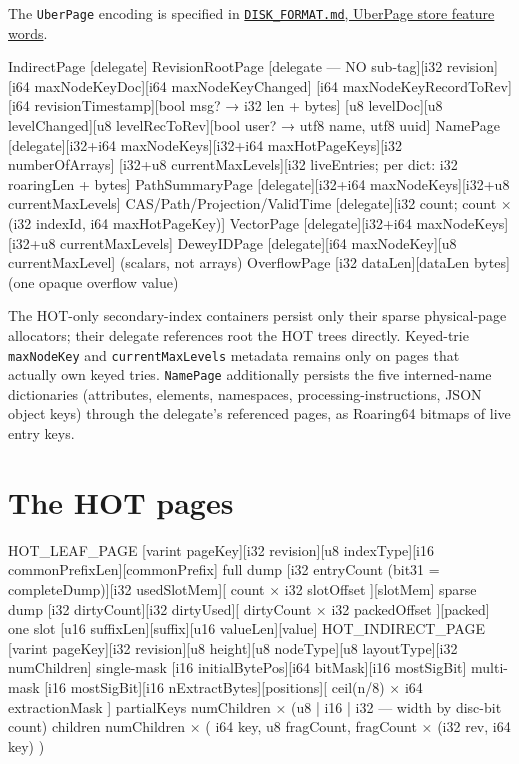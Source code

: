 \documentclass[11pt,a4paper,oneside]{report}
\theoremstyle{sirixthm}
\newcommand{\code}[1]{\texttt{#1}}
\begin{document}
The \code{UberPage} encoding is specified in
\href{DISK_FORMAT.md\#uberpage-store-feature-words}{\code{DISK\_FORMAT.md}, UberPage store feature words}.

\begin{diagramS}
IndirectPage      [delegate]
RevisionRootPage  [delegate — NO sub-tag][i32 revision][i64 maxNodeKeyDoc][i64 maxNodeKeyChanged]
                  [i64 maxNodeKeyRecordToRev][i64 revisionTimestamp][bool msg? → i32 len + bytes]
                  [u8 levelDoc][u8 levelChanged][u8 levelRecToRev][bool user? → utf8 name, utf8 uuid]
NamePage          [delegate][i32+i64 maxNodeKeys][i32+i64 maxHotPageKeys][i32 numberOfArrays]
                  [i32+u8 currentMaxLevels][i32 liveEntries; per dict: i32 roaringLen + bytes]
PathSummaryPage   [delegate][i32+i64 maxNodeKeys][i32+u8 currentMaxLevels]
CAS/Path/Projection/ValidTime [delegate][i32 count; count $\times$ (i32 indexId, i64 maxHotPageKey)]
VectorPage        [delegate][i32+i64 maxNodeKeys][i32+u8 currentMaxLevels]
DeweyIDPage       [delegate][i64 maxNodeKey][u8 currentMaxLevel]            (scalars, not arrays)
OverflowPage      [i32 dataLen][dataLen bytes]                             (one opaque overflow value)
\end{diagramS}

The HOT-only secondary-index containers persist only their sparse physical-page allocators; their
delegate references root the HOT trees directly. Keyed-trie \code{maxNodeKey} and
\code{currentMaxLevels} metadata remains only on pages that actually own keyed tries. \code{NamePage}
additionally persists the five interned-name dictionaries
(attributes, elements, namespaces, processing-instructions, JSON object keys) through the delegate's
referenced pages, as Roaring64 bitmaps of live entry keys.

\section{The HOT pages}

\begin{diagramS}
HOT_LEAF_PAGE     [varint pageKey][i32 revision][u8 indexType][i16 commonPrefixLen][commonPrefix]
  full dump       [i32 entryCount (bit31 = completeDump)][i32 usedSlotMem][ count × i32 slotOffset ][slotMem]
  sparse dump     [i32 dirtyCount][i32 dirtyUsed][ dirtyCount × i32 packedOffset ][packed]
  one slot        [u16 suffixLen][suffix][u16 valueLen][value]
HOT_INDIRECT_PAGE [varint pageKey][i32 revision][u8 height][u8 nodeType][u8 layoutType][i32 numChildren]
  single-mask     [i16 initialBytePos][i64 bitMask][i16 mostSigBit]
  multi-mask      [i16 mostSigBit][i16 nExtractBytes][positions][ ceil(n/8) × i64 extractionMask ]
  partialKeys     numChildren × (u8 | i16 | i32   — width by disc-bit count)
  children        numChildren × ( i64 key, u8 fragCount, fragCount × (i32 rev, i64 key) )
\end{diagramS}
\end{document}

